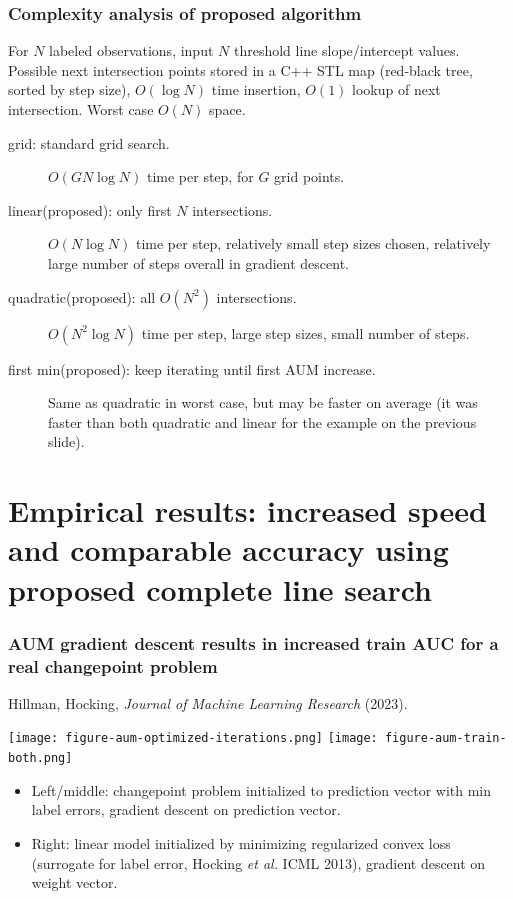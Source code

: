 \documentclass[t]{beamer}
\begin{document}
\begin{frame}
  \frametitle{Complexity analysis of proposed algorithm}

  For $N$ labeled observations, input $N$ threshold line
  slope/intercept values. Possible next intersection points stored in
  a C++ STL map (red-black tree, sorted by step size), $O(\log N)$
  time insertion, $O(1)$ lookup of next intersection. Worst case $O(N)$
  space.
  \begin{description}
  \item[grid: standard grid search.] $O(G N\log N)$ time per step, 
    for $G$ grid points.
  \item[linear(proposed): only first $N$ intersections.]
    $O(N\log N)$ time per step, relatively small step sizes chosen,
    relatively large number of steps overall in gradient descent.
  \item[quadratic(proposed): all $O(N^2)$ intersections.]
    $O(N^2\log N)$ time per step, large step sizes, small number of
    steps.
  \item[first min(proposed): keep iterating until first AUM increase.]
    Same as quadratic in worst case, but may be faster on average (it
    was faster than both quadratic and linear for the example on the
    previous slide).
  \end{description}
\end{frame}

\section{Empirical results: increased speed and comparable accuracy using proposed complete line search} 

\begin{frame}
  \frametitle{AUM gradient descent results in increased train AUC for
    a real changepoint problem}
 
Hillman, Hocking, \emph{Journal of Machine Learning Research} (2023).

\texttt{[image: figure-aum-optimized-iterations.png]}
\texttt{[image: figure-aum-train-both.png]}

\begin{itemize}
\item Left/middle: changepoint problem initialized to prediction vector with
  min label errors, gradient descent on prediction vector.
\item Right: linear model initialized by minimizing regularized convex
  loss (surrogate for label error, Hocking \emph{et al.} ICML 2013),
  gradient descent on weight vector.
\end{itemize}

\end{frame}
\end{document}
